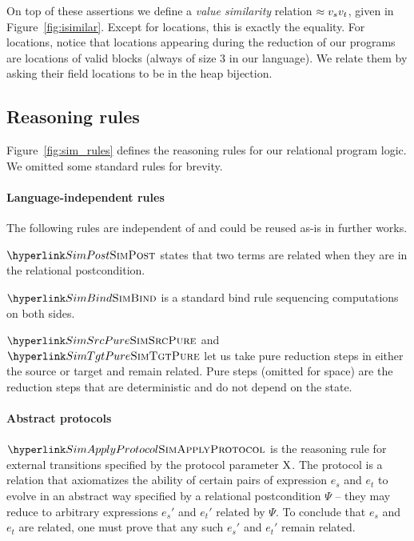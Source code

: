 

On top of these assertions we define a \emph{value similarity} relation $\approx {v_s} {v_t}$, given in Figure~\ref{fig:isimilar}.  Except for locations, this is exactly the equality. For locations, notice that locations appearing during the reduction of our programs are locations of valid blocks (always of size 3 in our language). We relate them by asking their field locations to be in the heap bijection.

\subsection{Reasoning rules}



Figure~\ref{fig:sim_rules} defines the reasoning rules for our relational program logic. We omitted some standard rules for brevity.

\paragraph{Language-independent rules} The following rules are
independent of \LambdaLang and could be reused as-is in further works.

$\RefTirName{SimPost}$ states that two terms are related when they are in the relational postcondition.

$\RefTirName{SimBind}$ is a standard bind rule sequencing computations on both sides.

$\RefTirName{SimSrcPure}$ and $\RefTirName{SimTgtPure}$ let us take pure reduction steps in either the source or target and remain related. Pure steps (omitted for space) are the reduction steps that are deterministic and do not depend on the state.

\paragraph{Abstract protocols}
$\RefTirName{SimApplyProtocol}$ is the reasoning rule for external transitions specified by the protocol parameter $\mathrm{X}$. The protocol is a relation that axiomatizes the ability of certain pairs of expression $e_s$ and $e_t$ to evolve in an abstract way specified by a relational postcondition $\Psi$ -- they may reduce to arbitrary expressions $e_s'$ and $e_t'$ related by $\Psi$. To conclude that $e_s$ and $e_t$ are related, one must prove that any such $e_s'$ and $e_t'$ remain related.

